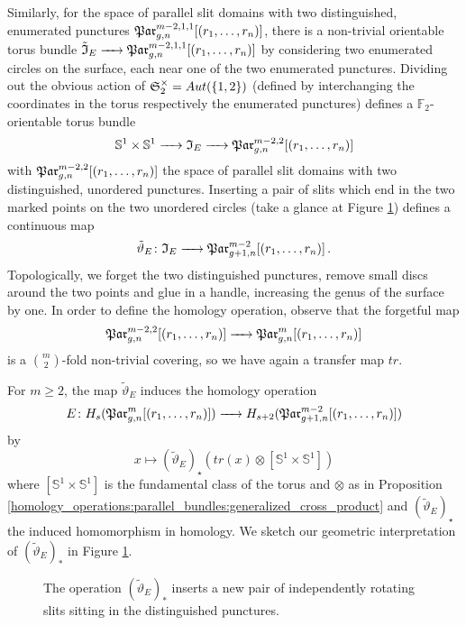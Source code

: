Similarly, for the space of parallel slit domains with two distinguished, enumerated punctures $\Par_{g,n}^{m-2,1,1}[(r_1, \ldots, r_n)]$,
there is a non-trivial orientable torus bundle $\tilde{\mathfrak I}_E \to \Par_{g,n}^{m-2,1,1}[(r_1, \ldots, r_n)]$ by considering two enumerated circles on the surface, each near one of the two enumerated punctures.
Dividing out the obvious action of $\mathfrak S_2^\times = Aut(\{1,2\})$ (defined by interchanging the coordinates in the torus respectively the enumerated punctures)
defines a $\mathbb F_2$-orientable torus bundle
\[
    \mathbb S^1 \times \mathbb S^1 \to \mathfrak I_E \to \Par_{g,n}^{m-2,2}[(r_1, \ldots, r_n)]
\]
with $\Par_{g,n}^{m-2,2}[(r_1, \ldots, r_n)]$ the space of parallel slit domains with two distinguished, unordered punctures.
Inserting a pair of slits which end in the two marked points on the two unordered circles (take a glance at Figure \ref{homology_operations:parallel_bundles:operation_e})
defines a continuous map
\label{page:operation_map_e}%
\[
    \tilde\vartheta_E \colon \mathfrak I_E \to \Par_{g+1,n}^{m-2}[(r_1, \ldots, r_n)] \,.
\]
Topologically, we forget the two distinguished punctures, remove small discs around the two points and glue in a handle, increasing the genus of the surface by one.
In order to define the homology operation, observe that the forgetful map
\[
    \Par_{g,n}^{m-2,2}[(r_1, \ldots, r_n)] \to \Par_{g,n}^m[(r_1, \ldots, r_n)]
\]
is a $\binom{m}{2}$-fold non-trivial covering, so we have again a transfer map $tr$.
\begin{defi}
    \label{homology_operations:parallel_bundles:def_operation_e}
    For $m \ge 2$, the map $\tilde\vartheta_E$ induces the homology operation
    \[
        E \colon H_s(\Par_{g,n}^m[(r_1, \ldots, r_n)]) \to H_{s+2}(\Par_{g+1,n}^{m-2}[(r_1, \ldots, r_n)])
    \]
    by
    \[
        x \mapsto (\tilde\vartheta_E)_\star( tr (x) \otimes [\mathbb S^1 \times \mathbb S^1])
    \]
    where $[\mathbb S^1 \times \mathbb S^1]$ is the fundamental class of the torus and $\otimes$ as in Proposition \ref{homology_operations:parallel_bundles:generalized_cross_product}
    and $(\tilde\vartheta_E)_\star$ the induced homomorphism in homology.
    We sketch our geometric interpretation of $(\tilde\vartheta_E)_\ast$ in Figure \ref{homology_operations:parallel_bundles:operation_e}.
\end{defi}
\begin{figure}[ht]
    \centering
    \caption{\label{homology_operations:parallel_bundles:operation_e}%
        The operation $(\tilde\vartheta_E)_\ast$ inserts a new pair of independently rotating slits sitting in the distinguished punctures.}
\end{figure}

